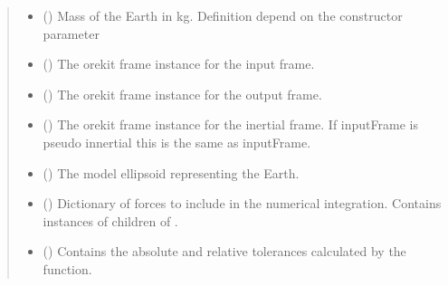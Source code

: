 \documentclass[letterpaper,10pt,english]{sphinxmanual}
\begin{document}
\begin{fulllineitems}
\begin{quote}
\begin{description}
\begin{itemize}
\item {} 
{\hyperref[\detokenize{modules/dpt_tools:dpt_tools.M_earth}]{}} () \textendash{} Mass of the Earth in kg. Definition depend on the {\hyperref[\detokenize{modules/propagator_orekit:propagator_orekit.PropagatorOrekit}]{}} constructor parameter 

\item {} 
 () \textendash{} The orekit frame instance for the input frame.

\item {} 
 () \textendash{} The orekit frame instance for the output frame.

\item {} 
 () \textendash{} The orekit frame instance for the inertial frame. If inputFrame is pseudo innertial this is the same as inputFrame.

\item {} 
 () \textendash{} The model ellipsoid representing the Earth.

\item {} 
 () \textendash{} Dictionary of forces to include in the numerical integration. Contains instances of children of .

\item {} 
 () \textendash{} Contains the absolute and relative tolerances calculated by the  function.


\end{itemize}
\end{description}
\end{quote}
\end{fulllineitems}
\end{document}
